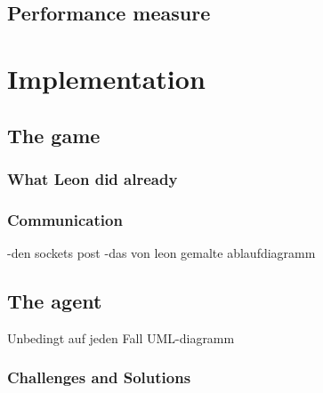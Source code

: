 \subsection{Performance measure}

\section{Implementation}

\subsection{The game}

\subsubsection{What Leon did already}

\subsubsection{Communication}


\begin{figure}
%		
%		
%		
%		
\end{figure}

-den sockets post
-das von leon gemalte ablaufdiagramm

\subsection{The agent}

Unbedingt auf jeden Fall UML-diagramm

\subsubsection{Challenges and Solutions}

